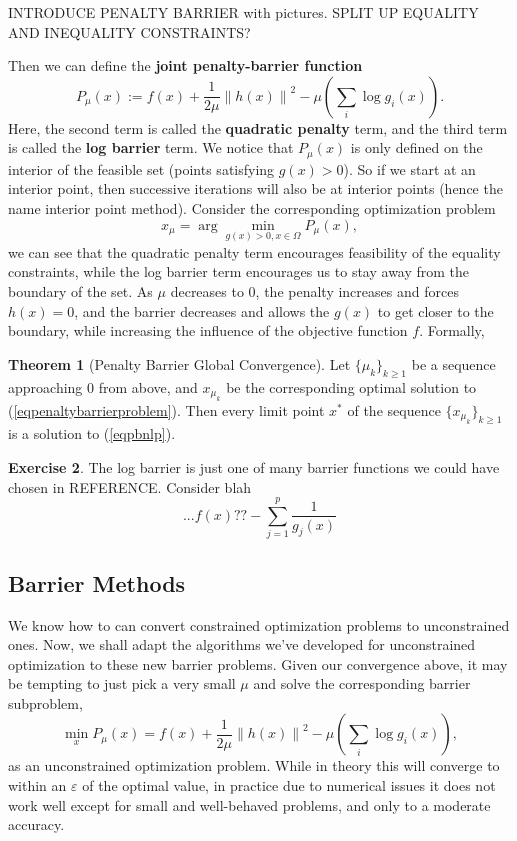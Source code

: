 \documentclass[11pt]{article}
\numberwithin{equation}{section}
\theoremstyle{definition}
\newtheorem{theorem}{Theorem}[section]
\newtheorem{exercise}[theorem]{Exercise}
\newcommand{\norm}[1]{\left\lVert#1\right\rVert}
\begin{document}
INTRODUCE PENALTY BARRIER with pictures. SPLIT UP EQUALITY AND INEQUALITY CONSTRAINTS?

Then we can define the \textbf{joint penalty-barrier function}
\begin{equation}
    P_\mu(x):=f(x)+\frac1{2\mu}\norm{h(x)}^2-\mu\left(\sum_i\log g_i(x)\right).
\end{equation}
Here, the second term is called the \textbf{quadratic penalty} term, and the third term is called the \textbf{log barrier} term. We notice that $P_\mu(x)$ is only defined on the interior of the feasible set (points satisfying $g(x)>0$). So if we start at an interior point, then successive iterations will also be at interior points (hence the name interior point method). Consider the corresponding optimization problem
\begin{equation}
    \label{eqpenaltybarrierproblem}
    x_\mu=\arg\min_{g(x)>0,x\in\Omega}P_\mu(x),
\end{equation}
we can see that the quadratic penalty term encourages feasibility of the equality constraints, while the log barrier term encourages us to stay away from the boundary of the set. As $\mu$ decreases to $0$, the penalty increases and forces $h(x)=0$, and the barrier decreases and allows the $g(x)$ to get closer to the boundary, while increasing the influence of the objective function $f$. Formally,
\begin{theorem}[Penalty Barrier Global Convergence]
    Let $\{\mu_k\}_{k\ge1}$ be a sequence approaching $0$ from above, and $x_{\mu_k}$ be the corresponding optimal solution to (\ref{eqpenaltybarrierproblem}). Then every limit point $x^*$ of the sequence $\{x_{\mu_k}\}_{k\ge1}$ is a solution to (\ref{eqpbnlp}).
\end{theorem}

\begin{exercise}
The log barrier is just one of many barrier functions we could have chosen in REFERENCE. Consider blah
\begin{equation}
    ...f(x)??- \sum_{j=1}^p\frac1{g_j(x)}
\end{equation}
\end{exercise}
\subsection{Barrier Methods}
We know how to can convert constrained optimization problems to unconstrained ones. Now, we shall adapt the algorithms we've developed for unconstrained optimization to these new barrier problems. Given our convergence above, it may be tempting to just pick a very small $\mu$ and solve the corresponding barrier subproblem,
\begin{equation}
    \min_x P_\mu(x)=f(x)+\frac1{2\mu}\norm{h(x)}^2-\mu\left(\sum_i\log g_i(x)\right),
\end{equation}
as an unconstrained optimization problem. While in theory this will converge to within an $\varepsilon$ of the optimal value, in practice due to numerical issues it does not work well except for small and well-behaved problems, and only to a moderate accuracy.
\end{document}
